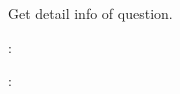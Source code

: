 \documentclass[letterpaper,10pt,english,openany,oneside]{sphinxmanual}
\begin{document}
\begin{fulllineitems}
\label{\detokenize{api-qa/v1:post--api-qa-v1-VMW-detail}}
\sphinxAtStartPar
Get detail info of question.

\sphinxAtStartPar
{}:

\begin{sphinxVerbatim}[commandchars=\\\{\}]
   
\end{sphinxVerbatim}

\sphinxAtStartPar
{}:


\end{fulllineitems}
\end{document}
